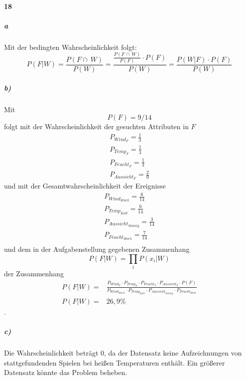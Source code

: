 \paragraph{18}
\subparagraph{a}
Mit der bedingten Wahrscheinlichkeit folgt:
\begin{equation}
P(F|W) = \frac{P(F\cap\ W)}{P(W)} = \frac{\frac{P(F\,\cap\, W)}{P(F)}\cdot P(F)}{P(W)} = \frac{P(W|F)\cdot P(F)}{P(W)}
\end{equation}

\subparagraph{b)}
Mit
\begin{equation}
  P(F)=9/14
\end{equation}
folgt mit der Wahrscheinlichkeit der gesuchten Attributen in $F$
\begin{align}
P_{Wind_F}=\frac{1}{3} \\
P_{Temp_F}=\frac{1}{3} \\
P_{Feucht_F}=\frac{1}{3} \\
P_{Aussicht_F}=\frac{2}{9}
\end{align}
und mit der Gesamtwahrscheinlichkeit der Ereignisse
\begin{align}
  P_{Wind_{Stark}}=\frac{6}{14} \\
  P_{Temp_{Kalt}}=\frac{6}{14} \\
  P_{Aussicht_{Sonnig}}=\frac{3}{14} \\
  P_{Feucht_{Hoch}}=\frac{7}{14} \\
\end{align}
und dem in der Aufgabenstellung gegebenen Zusammenhang
\begin{equation}
  P(F| W)=\prod_{i} P(x_i | W)
\end{equation} der Zusammenhang
\begin{align}
  P(F | W) =& \frac{P_{Wind_F} \cdot P_{Temp_F} \cdot P_{Feucht_F} \cdot P_{Aussicht_F}\cdot P(F)}{P_{Wind_{Stark}} \cdot P_{Temp_{Kalt}} \cdot P_{Aussicht_{Sonnig}} \cdot P_{Feucht_{Hoch}}} \\
  P(F | W) =& 26,9 \%
\end{align}
.

\subparagraph{c)}
Die Wahrscheinlichkeit beträgt 0, da der Datensatz keine Aufzeichnungen von stattgefundenden Spielen bei heißen Temperaturen enthält.
Ein größerer Datensatz könnte das Problem beheben.

